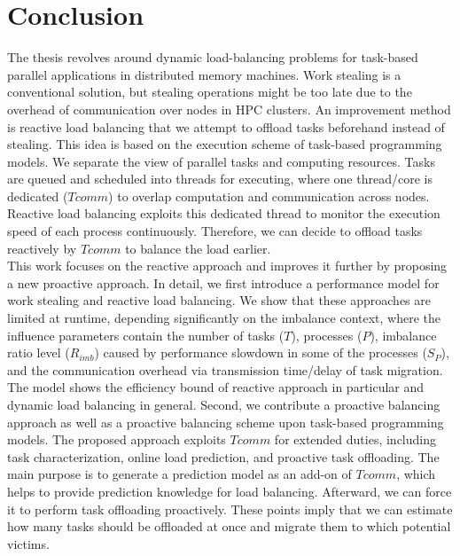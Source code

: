 \chapter{Conclusion}
\label{ch:Conclusion}


The thesis revolves around dynamic load-balancing problems for task-based parallel applications in distributed memory machines. Work stealing is a conventional solution, but stealing operations might be too late due to the overhead of communication over nodes in HPC clusters. An improvement method is reactive load balancing that we attempt to offload tasks beforehand instead of stealing. This idea is based on the execution scheme of task-based programming models. We separate the view of parallel tasks and computing resources. Tasks are queued and scheduled into threads for executing, where one thread/core is dedicated ($Tcomm$) to overlap computation and communication across nodes. Reactive load balancing exploits this dedicated thread to monitor the execution speed of each process continuously. Therefore, we can decide to offload tasks reactively by $Tcomm$ to balance the load earlier.\\

This work focuses on the reactive approach and improves it further by proposing a new proactive approach. In detail, we first introduce a performance model for work stealing and reactive load balancing. We show that these approaches are limited at runtime, depending significantly on the imbalance context, where the influence parameters contain the number of tasks ($T$), processes ($P$), imbalance ratio level ($R_{imb}$) caused by performance slowdown in some of the processes ($S_{P}$), and the communication overhead via transmission time/delay of task migration. The model shows the efficiency bound of reactive approach in particular and dynamic load balancing in general. Second, we contribute a proactive balancing approach as well as a proactive balancing scheme upon task-based programming models. The proposed approach exploits $Tcomm$ for extended duties, including task characterization, online load prediction, and proactive task offloading. The main purpose is to generate a prediction model as an add-on of $Tcomm$, which helps to provide prediction knowledge for load balancing. Afterward, we can force it to perform task offloading proactively. These points imply that we can estimate how many tasks should be offloaded at once and migrate them to which potential victims.\\

